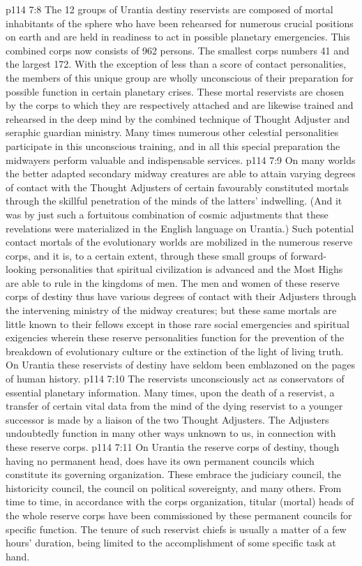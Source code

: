 \vs p114 7:8 The 12 groups of Urantia destiny reservists are composed of mortal inhabitants of the sphere who have been rehearsed for numerous crucial positions on earth and are held in readiness to act in possible planetary emergencies. This combined corps now consists of 962 persons. The smallest corps numbers 41 and the largest 172. With the exception of less than a score of contact personalities, the members of this unique group are wholly unconscious of their preparation for possible function in certain planetary crises. These mortal reservists are chosen by the corps to which they are respectively attached and are likewise trained and rehearsed in the deep mind by the combined technique of Thought Adjuster and seraphic guardian ministry. Many times numerous other celestial personalities participate in this unconscious training, and in all this special preparation the midwayers perform valuable and indispensable services.
\vs p114 7:9 On many worlds the better adapted secondary midway creatures are able to attain varying degrees of contact with the Thought Adjusters of certain favourably constituted mortals through the skillful penetration of the minds of the latters’ indwelling. (And it was by just such a fortuitous combination of cosmic adjustments that these revelations were materialized in the English language on Urantia.) Such potential contact mortals of the evolutionary worlds are mobilized in the numerous reserve corps, and it is, to a certain extent, through these small groups of forward\hyp{}looking personalities that spiritual civilization is advanced and the Most Highs are able to rule in the kingdoms of men. The men and women of these reserve corps of destiny thus have various degrees of contact with their Adjusters through the intervening ministry of the midway creatures; but these same mortals are little known to their fellows except in those rare social emergencies and spiritual exigencies wherein these reserve personalities function for the prevention of the breakdown of evolutionary culture or the extinction of the light of living truth. On Urantia these reservists of destiny have seldom been emblazoned on the pages of human history.
\vs p114 7:10 The reservists unconsciously act as conservators of essential planetary information. Many times, upon the death of a reservist, a transfer of certain vital data from the mind of the dying reservist to a younger successor is made by a liaison of the two Thought Adjusters. The Adjusters undoubtedly function in many other ways unknown to us, in connection with these reserve corps.
\vs p114 7:11 On Urantia the reserve corps of destiny, though having no permanent head, does have its own permanent councils which constitute its governing organization. These embrace the judiciary council, the historicity council, the council on political sovereignty, and many others. From time to time, in accordance with the corps organization, titular (mortal) heads of the whole reserve corps have been commissioned by these permanent councils for specific function. The tenure of such reservist chiefs is usually a matter of a few hours’ duration, being limited to the accomplishment of some specific task at hand.
